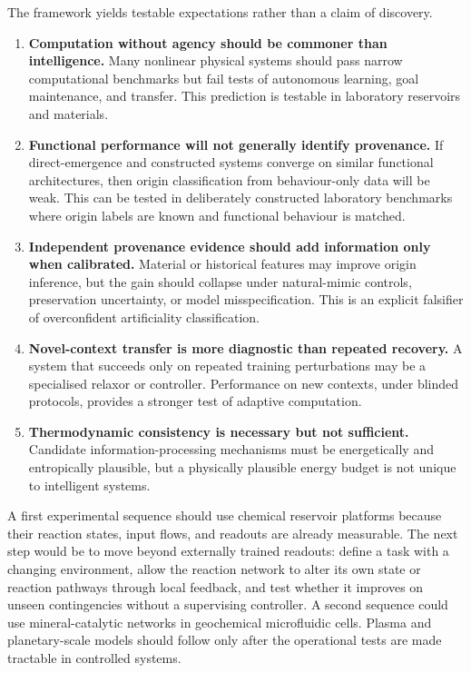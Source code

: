 \documentclass[11pt]{article}
\begin{document}
The framework yields testable expectations rather than a claim of discovery.
\begin{enumerate}
  \item \textbf{Computation without agency should be commoner than intelligence.} Many nonlinear physical systems should pass narrow computational benchmarks but fail tests of autonomous learning, goal maintenance, and transfer. This prediction is testable in laboratory reservoirs and materials.
  \item \textbf{Functional performance will not generally identify provenance.} If direct-emergence and constructed systems converge on similar functional architectures, then origin classification from behaviour-only data will be weak. This can be tested in deliberately constructed laboratory benchmarks where origin labels are known and functional behaviour is matched.
  \item \textbf{Independent provenance evidence should add information only when calibrated.} Material or historical features may improve origin inference, but the gain should collapse under natural-mimic controls, preservation uncertainty, or model misspecification. This is an explicit falsifier of overconfident artificiality classification.
  \item \textbf{Novel-context transfer is more diagnostic than repeated recovery.} A system that succeeds only on repeated training perturbations may be a specialised relaxor or controller. Performance on new contexts, under blinded protocols, provides a stronger test of adaptive computation.
  \item \textbf{Thermodynamic consistency is necessary but not sufficient.} Candidate information-processing mechanisms must be energetically and entropically plausible, but a physically plausible energy budget is not unique to intelligent systems.
\end{enumerate}

A first experimental sequence should use chemical reservoir platforms because their reaction states, input flows, and readouts are already measurable. The next step would be to move beyond externally trained readouts: define a task with a changing environment, allow the reaction network to alter its own state or reaction pathways through local feedback, and test whether it improves on unseen contingencies without a supervising controller. A second sequence could use mineral-catalytic networks in geochemical microfluidic cells. Plasma and planetary-scale models should follow only after the operational tests are made tractable in controlled systems.
\end{document}
